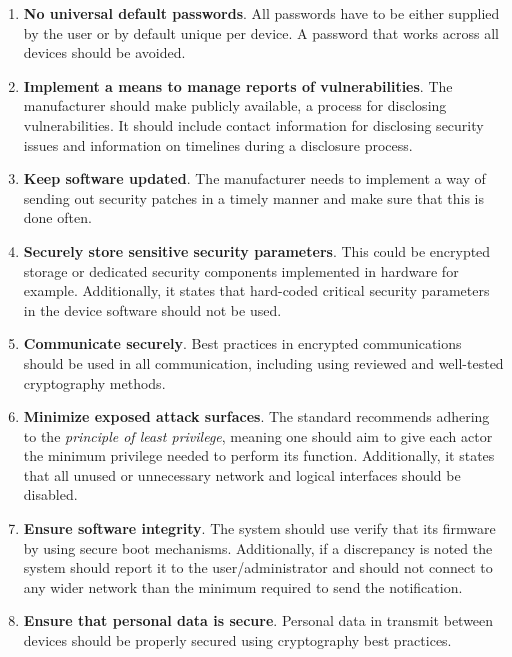 \begin{enumerate}
    \item \textbf{No universal default passwords}. All passwords have to be either supplied by the user or by default unique per device. A password that works across all devices should be avoided.
    
    \item \textbf{Implement a means to manage reports of vulnerabilities}. The manufacturer should make publicly available, a process for disclosing vulnerabilities. It should include contact information for disclosing security issues and information on timelines during a disclosure process.
    
    \item \textbf{Keep software updated}. The manufacturer needs to implement a way of sending out security patches in a timely manner and make sure that this is done often.
    
    \item \textbf{Securely store sensitive security parameters}. This could be encrypted storage or dedicated security components implemented in hardware for example. Additionally, it states that hard-coded critical security parameters in the device software should not be used. 
    
    \item \textbf{Communicate securely}. Best practices in encrypted communications should be used in all communication, including using reviewed and well-tested cryptography methods.
    
    \item \textbf{Minimize exposed attack surfaces}. The standard recommends adhering to the \textit{principle of least privilege}, meaning one should aim to give each actor the minimum privilege needed to perform its function. Additionally, it states that all unused or unnecessary network and logical interfaces should be disabled.
    
    \item \textbf{Ensure software integrity}. The system should use verify that its firmware by using secure boot mechanisms. Additionally, if a discrepancy is noted the system should report it to the user/administrator and should not connect to any wider network than the minimum required to send the notification.
    
    \item \textbf{Ensure that personal data is secure}. Personal data in transmit between devices should be properly secured using cryptography best practices.
    

\end{enumerate}
